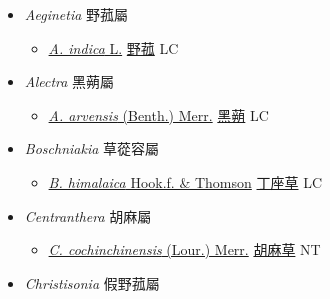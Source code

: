 
  \begin{itemize}
 \item[] \textit{Aeginetia} 野菰屬
                    
  \begin{itemize}
        \item[] \href{http://www.theplantlist.org/tpl1.1/search?q=Aeginetia+indica}{\textit{A. indica} L.}   \href{\detokenize{http://taibnet.sinica.edu.tw/chi/taibnet_species_list.php?T2=野菰&T2_new_value=true&fr=y}}{野菰} LC
  \end{itemize}
 \item[] \textit{Alectra} 黑蒴屬
                    
  \begin{itemize}
        \item[] \href{http://www.theplantlist.org/tpl1.1/search?q=Alectra+arvensis}{\textit{A. arvensis} (Benth.) Merr.}     \href{\detokenize{http://taibnet.sinica.edu.tw/chi/taibnet_species_list.php?T2=黑蒴&T2_new_value=true&fr=y}}{黑蒴} LC
  \end{itemize}
 \item[] \textit{Boschniakia} 草蓯容屬
                    
  \begin{itemize}
        \item[] \href{http://www.theplantlist.org/tpl1.1/search?q=Boschniakia+himalaica}{\textit{B. himalaica} Hook.f. \& Thomson}   \href{\detokenize{http://taibnet.sinica.edu.tw/chi/taibnet_species_list.php?T2=丁座草&T2_new_value=true&fr=y}}{丁座草} LC
  \end{itemize}
 \item[] \textit{Centranthera} 胡麻屬
                    
  \begin{itemize}
        \item[] \href{http://www.theplantlist.org/tpl1.1/search?q=Centranthera+cochinchinensis}{\textit{C. cochinchinensis} (Lour.) Merr.}   \href{\detokenize{http://taibnet.sinica.edu.tw/chi/taibnet_species_list.php?T2=胡麻草&T2_new_value=true&fr=y}}{胡麻草} NT
  \end{itemize}
 \item[] \textit{Christisonia} 假野菰屬
                    

\end{itemize}

